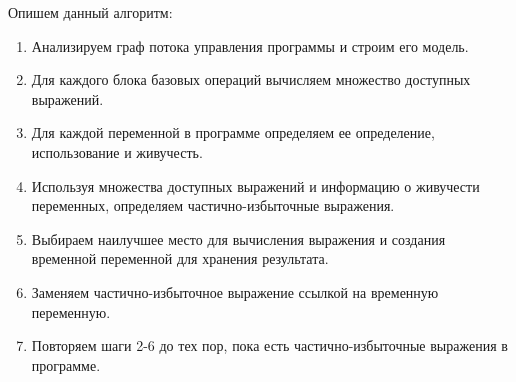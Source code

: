 Опишем данный алгоритм:
\begin{enumerate}
    \item Анализируем граф потока управления программы и строим его модель.
    \item Для каждого блока базовых операций вычисляем множество доступных выражений.
    \item Для каждой переменной в программе определяем ее определение, использование и живучесть.
    \item Используя множества доступных выражений и информацию о живучести переменных, определяем частично-избыточные выражения.
    \item Выбираем наилучшее место для вычисления выражения и создания временной переменной для хранения результата.
    \item Заменяем частично-избыточное выражение ссылкой на временную переменную.
    \item Повторяем шаги 2-6 до тех пор, пока есть частично-избыточные выражения в программе.
\end{enumerate}